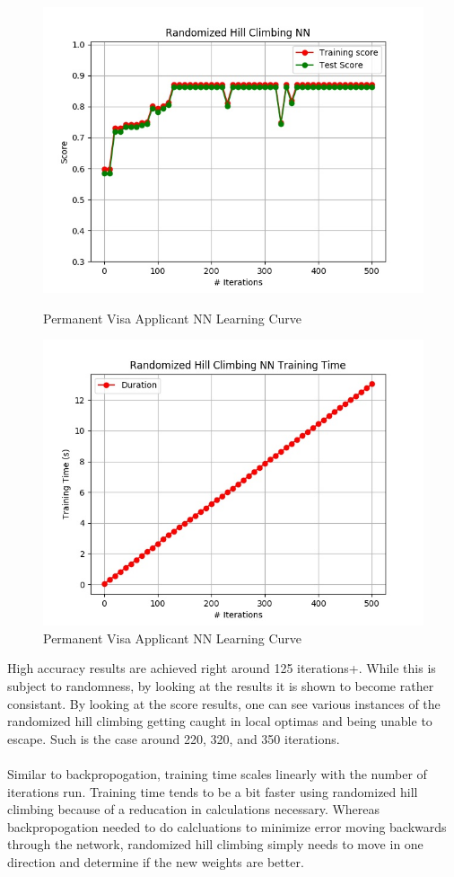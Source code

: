 \documentclass[h]{article}
\begin{document}
 \begin{figure}[H]
      \includegraphics[width=1\textwidth,keepaspectratio]{randomized_hill_climbing_nn.jpg} 
      \caption*{Permanent Visa Applicant NN Learning Curve} 
   \endminipage\hfill
      \includegraphics[width=1\textwidth,keepaspectratio]{randomized_hill_climbing_nn_time.jpg} 
      \caption*{Permanent Visa Applicant NN Learning Curve} 
   \endminipage\hfill
\end{figure}
High accuracy results are achieved right around 125 iterations+.  
While this is subject to randomness, by looking at the results it is shown to 
become rather consistant.  By looking at the score results, one can see various 
instances of the randomized hill climbing getting caught in local optimas and 
being unable to escape.  Such is the case around 220, 320, and 350 iterations.
\\ \\
Similar to backpropogation, training time scales linearly with the number of 
 iterations run. Training time tends to be a bit faster using randomized hill 
 climbing because of a reducation in calculations necessary.  Whereas 
 backpropogation needed to do calcluations to minimize error moving backwards 
 through the network, randomized hill climbing simply needs to move in one 
 direction and determine if the new weights are better.
 
\end{document}
